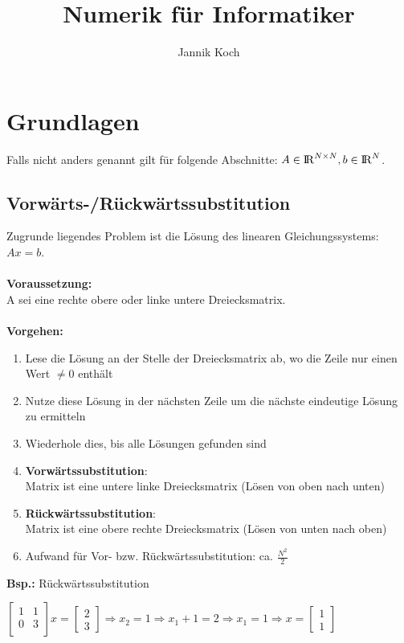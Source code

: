 \documentclass[10pt,a4paper]{article}
\author{Jannik Koch}
\title{Numerik für Informatiker}
\def\realnumbers{{\rm I\!R}}
\begin{document}
	{\let\newpage\relax\maketitle}
	\tableofcontents
	\newpage
	\setcounter{page}{1}

	\section{Grundlagen}
	Falls nicht anders genannt gilt für folgende Abschnitte: $A \in \realnumbers^{N \times N}, b \in \realnumbers^N$.
	
	\subsection{Vorwärts-/Rückwärtssubstitution}
	Zugrunde liegendes Problem ist die Lösung des linearen Gleichungssystems: $Ax = b$.\\\\
	\textbf{Voraussetzung:}\\A sei eine rechte obere oder linke untere Dreiecksmatrix.\\\\
	\textbf{Vorgehen:}
	\begin{enumerate}
		\item Lese die Lösung an der Stelle der Dreiecksmatrix ab, wo die Zeile nur einen Wert $\neq 0$ enthält
		\item Nutze diese Lösung in der nächsten Zeile um die nächste eindeutige Lösung zu ermitteln
		\item Wiederhole dies, bis alle Lösungen gefunden sind
		\item \textbf{Vorwärtssubstitution}:\\Matrix ist eine untere linke Dreiecksmatrix (Lösen von oben nach unten)
		\item \textbf{Rückwärtssubstitution}:\\Matrix ist eine obere rechte Dreiecksmatrix (Lösen von unten nach oben)
		\item Aufwand für Vor- bzw. Rückwärtssubstitution: ca. $\frac{N^2}{2}$
	\end{enumerate}
	\textbf{Bsp.:} Rückwärtssubstitution
	\begin{center}
		$\begin{bmatrix} 1 & 1\\0 & 3\\\end{bmatrix}x = \begin{bmatrix}2 \\ 3\end{bmatrix} \Rightarrow
		x_2 = 1 \Rightarrow x_1 + 1 = 2 \Rightarrow x_1 = 1 \Rightarrow x = \begin{bmatrix}1 \\ 1\end{bmatrix}$
	\end{center}
	
\end{document}
